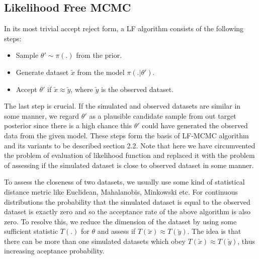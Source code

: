 \begin{multicols}{2}
\section{Likelihood Free MCMC}
\label{gmodels}

In its most trivial accept reject form, a LF algorithm consists of the following steps:
\begin{itemize}
\item Sample $\theta' \sim \pi(.)$ from the prior.
\item Generate dataset $\utilde{x}$ from the model $\pi(.|\theta')$.
\item Accept $\theta'$ if $\utilde{x}\approx \utilde{y}$, where $\utilde{y}$ is the observed dataset. 
\end{itemize}

The last step is crucial. If the simulated and observed datasets are similar in some manner, we regard $\theta'$ as a plausible candidate sample from out target posterior since there is a high chance this $\theta'$ could have generated the observed data from the given model. These steps form the basis of LF-MCMC algorithm and its variants to be described section 2.2. Note that here we have circumvented the problem of evaluation of likelihood function and replaced it with the problem of assessing if the simulated dataset is close to observed dataset in some manner.

To assess the closeness of two datasets, we usually use some kind of statistical distance metric like Euclidean, Mahalanobis, Minkowski etc. For continuous distributions the probability that the simulated dataset is equal to the observed dataset is exactly zero and so the acceptance rate of the above algorithm is also zero. To resolve this, we reduce the dimension of the dataset by using some sufficient statistic $T(.)$ for $\theta$ and assess if $T(\utilde{x})\approx T(\utilde{y})$. The idea is that there can be more than one simulated datasets which obey $T(\utilde{x})\approx T(\utilde{y})$, thus increasing aceptance probability.


\end{multicols}
